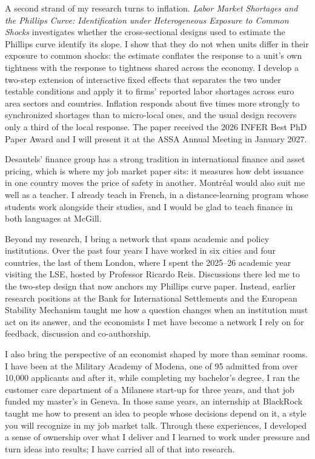 \documentclass[11pt]{article}
\begin{document}
A second strand of my research turns to inflation. \textit{Labor Market Shortages and the Phillips Curve: Identification under Heterogeneous Exposure to Common Shocks} investigates whether the cross-sectional designs used to estimate the Phillips curve identify its slope. I show that they do not when units differ in their exposure to common shocks: the estimate conflates the response to a unit's own tightness with the response to tightness shared across the economy. I develop a two-step extension of interactive fixed effects that separates the two under testable conditions and apply it to firms' reported labor shortages across euro area sectors and countries. Inflation responds about five times more strongly to synchronized shortages than to micro-local ones, and the usual design recovers only a third of the local response. The paper received the 2026 INFER Best PhD Paper Award and I will present it at the ASSA Annual Meeting in January 2027.

Desautels' finance group has a strong tradition in international finance and asset pricing, which is where my job market paper sits: it measures how debt issuance in one country moves the price of safety in another. Montréal would also suit me well as a teacher. I already teach in French, in a distance-learning program whose students work alongside their studies, and I would be glad to teach finance in both languages at McGill.

Beyond my research, I bring a network that spans academic and policy institutions. Over the past four years I have worked in six cities and four countries, the last of them London, where I spent the 2025--26 academic year visiting the LSE, hosted by Professor Ricardo Reis. Discussions there led me to the two-step design that now anchors my Phillips curve paper. Instead, earlier research positions at the Bank for International Settlements and the European Stability Mechanism taught me how a question changes when an institution must act on its answer, and the economists I met have become a network I rely on for feedback, discussion and co-authorship.

I also bring the perspective of an economist shaped by more than seminar rooms. I have been at the Military Academy of Modena, one of 95 admitted from over 10,000 applicants and after it, while completing my bachelor's degree, I ran the customer care department of a Milanese start-up for three years, and that job funded my master's in Geneva. In those same years, an internship at BlackRock taught me how to present an idea to people whose decisions depend on it, a style you will recognize in my job market talk. Through these experiences, I developed a sense of ownership over what I deliver and I learned to work under pressure and turn ideas into results; I have carried all of that into research. %
\end{document}
